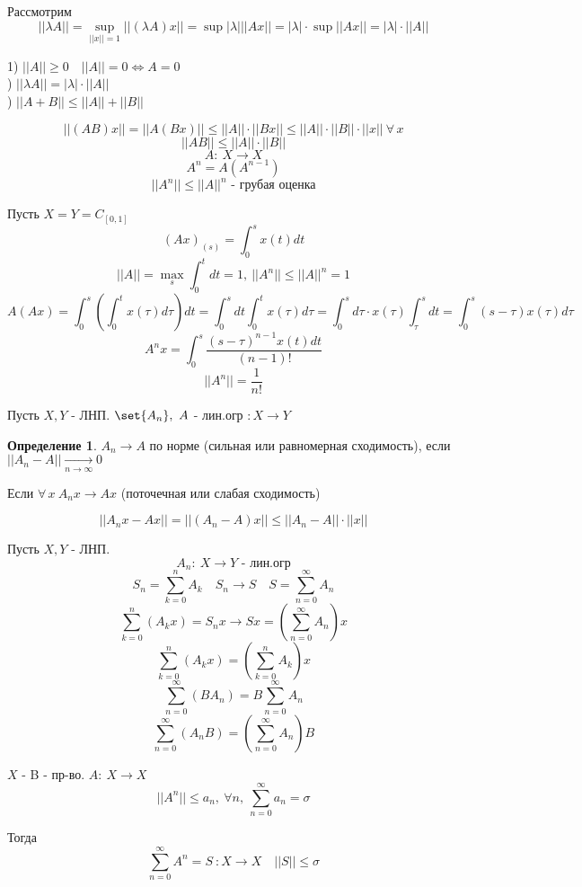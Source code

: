 \documentclass[a4paper]{article}
\DeclarePairedDelimiter\set\{\}
\theoremstyle{definition}
\newtheorem*{definition}{Определение}
\theoremstyle{remark}
\begin{document}
Рассмотрим
\[
    ||\lambda A|| = \sup_{||x|| = 1} ||(\lambda A)x|| = \sup |\lambda|
    ||Ax|| = |\lambda| \cdot \sup ||Ax|| = |\lambda| \cdot ||A||
\]

1) $ ||A|| \geq 0 \quad ||A|| = 0 \iff A = 0 $\\
) $ ||\lambda A|| = |\lambda| \cdot ||A|| $\\
) $||A + B|| \leq ||A|| + ||B||$

\[
    ||(AB)x|| = ||A(Bx)|| \leq ||A|| \cdot ||Bx|| \leq ||A|| \cdot ||B|| \cdot
    ||x|| \ \forall \, x
\]
\[
    ||AB|| \leq ||A|| \cdot ||B||
\]
\[
    A: \ X \to X
\]
\[
    A^{n} = A(A^{n-1})
\]
\[
    ||A^{n}|| \leq ||A||^{n} \text{ - грубая оценка}
\]

Пусть $ X = Y = C_{[0,1]} $ 
\[
    (Ax)_{(s)} = \int_{0}^{s} x(t) dt
\]
\[
    ||A|| = \max_s \int_{0}^{t} dt = 1, \ ||A^{n}|| \leq ||A||^{n} = 1
\]
\[
    A(Ax) = \int_{0}^{s} \left( \int_{0}^{t} x(\tau) d \tau \right) dt
    = \int_{0}^{s} dt \int_{0}^{t} x(\tau) d \tau = 
    \int_{0}^{s} d \tau \cdot x(\tau) \int_{\tau}^{s} dt = 
    \int_{0}^{s} (s - \tau) x(\tau) d \tau
\]
\[
    A^{n} x = \int_{0}^{s} \frac{(s - \tau)^{n-1} x(t) dt}{(n-1)!}
\]
\[
    ||A^{n}|| = \frac{1}{n!} 
\]

Пусть $ X,Y $ - ЛНП. $ \set{A_n}, \ A $ - лин.огр $ : X \to Y $ 

\begin{tcolorbox}
    \begin{definition}
        $ A_n \to A $ по норме (сильная или равномерная сходимость), если
        $ ||A_n - A|| \xrightarrow[n \to \infty]{} 0 $ 

        Если $ \forall \, x \ A_n x \to Ax $ (поточечная или слабая сходимость)
    \end{definition}
\end{tcolorbox}
\[
    ||A_n x - Ax|| = ||(A_n - A)x|| \leq ||A_n - A|| \cdot ||x||
\]


Пусть $ X,Y $ - ЛНП.
\[
    A_n : \ X \to Y \text{ - лин.огр}
\]
\[
    S_n = \sum_{k=0}^{n} A_k \quad S_n \to S \quad S = \sum_{n=0}^{\infty} A_n
\]
\[
    \sum_{k=0}^{n} (A_k x) = S_n x \to Sx = \left( \sum_{n=0}^{\infty} 
    A_n \right) x
\]
\[
    \sum_{k=0}^{n} (A_k x) = \left(\sum_{k=0}^{n} A_k\right)x
\]
\[
    \sum_{n=0}^{\infty} (BA_n) = B \sum_{n=0}^{\infty} A_n
\]
\[
    \sum_{n=0}^{\infty} (A_nB) = \left( \sum_{n=0}^{\infty} A_n \right) B
\]

$ X $ - B - пр-во. $ A: \ X \to X $ 
\[
    ||A^{n}|| \leq a_n, \ \forall n, \ \sum_{n=0}^{\infty} a_n = \sigma
\]

Тогда 
\[
    \sum_{n=0}^{\infty} A^{n} = S \ : X \to X \quad ||S|| \leq \sigma
\]
\end{document}
